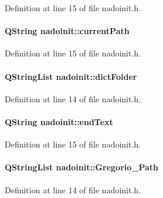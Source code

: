 \-Definition at line 15 of file nadoinit.\-h.

\hypertarget{classnadoinit_a60c7078faeb9e398181107cbd1604ac0}{
\paragraph[{current\-Path}]{\setlength{\rightskip}{0pt plus 5cm}\-Q\-String {\bf nadoinit\-::current\-Path}}}\label{classnadoinit_a60c7078faeb9e398181107cbd1604ac0}


\-Definition at line 15 of file nadoinit.\-h.

\hypertarget{classnadoinit_a50b65542641d11f5184a6aa615ba9500}{
\paragraph[{dict\-Folder}]{\setlength{\rightskip}{0pt plus 5cm}\-Q\-String\-List {\bf nadoinit\-::dict\-Folder}}}\label{classnadoinit_a50b65542641d11f5184a6aa615ba9500}


\-Definition at line 14 of file nadoinit.\-h.

\hypertarget{classnadoinit_a9a7c2dc3edc0b30cfdb83d2cd8a7b87b}{
\paragraph[{end\-Text}]{\setlength{\rightskip}{0pt plus 5cm}\-Q\-String {\bf nadoinit\-::end\-Text}}}\label{classnadoinit_a9a7c2dc3edc0b30cfdb83d2cd8a7b87b}


\-Definition at line 15 of file nadoinit.\-h.

\hypertarget{classnadoinit_a20f5cafb5bf05df6d89deb43b595a192}{
\paragraph[{\-Gregorio\-\_\-\-Path}]{\setlength{\rightskip}{0pt plus 5cm}\-Q\-String\-List {\bf nadoinit\-::\-Gregorio\-\_\-\-Path}}}\label{classnadoinit_a20f5cafb5bf05df6d89deb43b595a192}


\-Definition at line 14 of file nadoinit.\-h.

